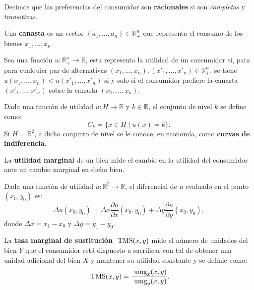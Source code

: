 \documentclass[8pt,a4paper]{extarticle}
\begin{document}
\begin{multicols}{3}
	\begin{boxdef}[Racionalidad]
		Decimos que las preferencias del consumidor son \textbf{racionales} si son \emph{completas} y \emph{transitivas}.
	\end{boxdef}

	\begin{boxdef}[Canasta]
		Una \textbf{canasta} es un vector $(a_1, \ldots, a_n) \in \mathbb{R}^n_+$ que representa el consumo de los bienes $x_1, \ldots, x_n$.
	\end{boxdef}

	\begin{boxdef}
		Sea una función $u : \mathbb{R}^n_+ \to \mathbb{R}$, esta representa la utilidad de un consumidor si, para para cualquier par de alternativas $(x_1, \ldots, x_n), (x'_1, \ldots, x'_n) \in \mathbb{R}^n_+$, se tiene $u(x_1, \ldots, x_n) < u(x'_1, \ldots, x'_n)$ si y solo si el consumidor prefiere la canasta $(x'_1, \ldots, x'_n)$ sobre la canasta $(x_1, \ldots, x_n)$.
	\end{boxdef}

	\begin{boxdef}
		Dada una función de utilidad $u : H \to \mathbb{R}$ y $k \in \mathbb{R}$, el conjunto de nivel $k$ se define como:
		\[
			C_k = \{x \in H  \mid u(x) = k\}
			.\]
		Si $H = \mathbb{R}^2$, a dicho conjunto de nivel se le conoce, en economía, como \textbf{curvas de indiferencia}.
	\end{boxdef}

	\begin{boxdef}
		La \textbf{utilidad marginal} de un bien mide el cambio en la utilidad del consumidor ante un cambio marginal en dicho bien.
	\end{boxdef}

	\begin{boxtheo}
		Dada una función de utilidad $u : \mathbb{R}^2 \to \mathbb{R}$, el diferencial de $u$ evaluado en el punto $(x_0, y_0)$ es:
		\[
			\Delta u(x_0, y_0) = \Delta x \frac{\partial u}{\partial x} (x_0, y_0) + \Delta y \frac{\partial u}{\partial y} (x_0 , y_0)
			,\] donde $\Delta x = x_1 - x_0$ y $\Delta y = y_1 - y_0$.
	\end{boxtheo}

	\begin{boxdef}
		La \textbf{tasa marginal de sustitución} $\text{ \normalfont TMS}(x, y)$ mide el número de unidades del bien $Y$ que el consumidor está dispuesto a sacrificar con tal de obtener una unidad adicional del bien $X$ y mantener su utilidad constante y se definie como:
		\[
			\text{ \normalfont TMS}(x,y)=\frac{\text{ \normalfont umg}_x (x,y)}{\text{ \normalfont umg}_y (x,y)}
			.\]
	\end{boxdef}


\end{multicols}
\end{document}
